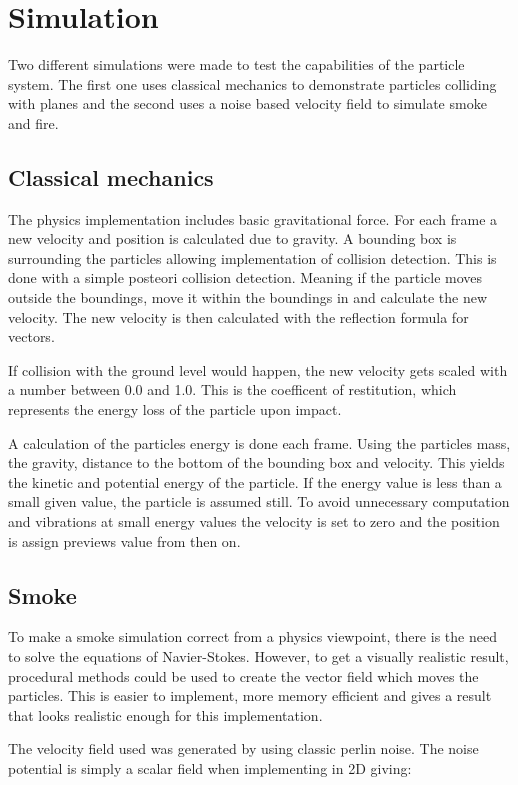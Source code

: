 \documentclass[journal]{vgtc}                %
\begin{document}
	\section{Simulation}
Two different simulations were made to test the capabilities of the particle system. The first one uses classical mechanics to demonstrate particles colliding with planes and the second uses a noise based velocity field to simulate smoke and fire. 


	\subsection{Classical mechanics}

The physics implementation includes basic gravitational force. For each frame a new velocity and position is calculated due to gravity. 
A bounding box is surrounding the particles allowing implementation of collision detection. This is done with a simple posteori collision detection. Meaning if the particle moves outside the boundings, move it within the boundings in and calculate the new velocity. The new velocity is then calculated with the reflection formula for vectors.

If collision with the ground level would happen, the new velocity gets scaled with a number between 0.0 and 1.0. This is the coefficent of restitution, which represents the energy loss of the particle upon impact.

A calculation of the particles energy is done each frame. Using the particles mass, the gravity, distance to the bottom of the bounding box and velocity. This yields the kinetic and potential energy of the particle. If the energy value is less than a small given value, the particle is assumed still. To avoid unnecessary computation and vibrations at small energy values the velocity is set to zero and the position is assign previews value from then on.


	\subsection{Smoke}
To make a smoke simulation correct from a physics viewpoint, there is the need to solve the equations of Navier-Stokes. However, to get a visually realistic result, procedural methods could be used to create the vector field which moves the particles. This is easier to implement, more memory efficient and gives a result that looks realistic enough for this implementation.

The velocity field used was generated by using classic perlin noise. The noise potential is simply a scalar field when implementing in 2D giving: 
	
\end{document}
